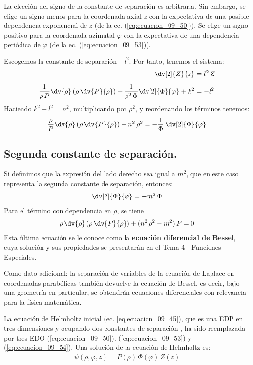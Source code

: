 La elección del signo de la constante de separación es arbitraria. Sin embargo, se elige un signo menos para la coordenada axial $z$ con la expectativa de una posible dependencia exponencial de $z$ (de la ec. (\ref{eq:ecuacion_09_50})). Se elige un signo positivo para la coordenada azimutal $\varphi$ con la expectativa de una dependencia periódica de $\varphi$ (de la ec. (\ref{eq:ecuacion_09_53})).
\par
Escogemos la constante de separación $- l^{2}$. Por tanto, tenemos el sistema:
\begin{align}
\dv[2]{Z}{z} &= l^{2} \, Z \label{eq:ecuacion_09_50} \\[0.5em]
\dfrac{1}{\rho \, P} \dv{\rho} \left( \rho \, \dv{P}{\rho} \right) + \dfrac{1}{\rho^{2} \, \Phi} \dv[2]{\Phi}{\varphi} + k^{2} &= - l^{2} \label{eq:ecuacion_09_51}
\end{align}
Haciendo $k^{2} + l^{2} = n^{2}$, multiplicando por $\rho^{2}$, y reordenando los términos tenemos:
\begin{align}
\dfrac{\rho}{P} \dv{\rho} \left( \rho \, \dv{P}{\rho} \right) + n^{2} \, \rho^{2} = - \dfrac{1}{\Phi} \, \dv[2]{\Phi}{\varphi}
\label{eq:ecuacion_09_52}
\end{align}

\subsection{Segunda constante de separación.}

Si definimos que la expresión del lado derecho sea igual a $m^{2}$, que en este caso representa la segunda constante de separación, entonces:
\begin{align}
\dv[2]{\Phi}{\varphi} = - m^{2} \, \Phi
\label{eq:ecuacion_09_53}
\end{align}
Para el término con dependencia en $\rho$, se tiene
\begin{align}
\rho \, \dv{\rho} \left( \rho \, \dv{P}{\rho} \right) + (n^{2} \, \rho^{2} - m^{2}) \, P = 0
\label{eq:ecuacion_09_54}
\end{align}
Esta última ecuación se le conoce como la \textbf{ecuación diferencial de Bessel}, cuya solución y sus propiedades se presentarán en el Tema 4 - Funciones Especiales. 
\par
Como dato adicional: la separación de variables de la ecuación de Laplace en coordenadas parabólicas también devuelve la ecuación de Bessel, es decir, bajo una geometría en particular, se obtendrán ecuaciones diferenciales con relevancia para la física matemática.
\par
La ecuación de Helmholtz inicial (ec. \ref{eq:ecuacion_09_45}), que es una EDP en tres dimensiones y ocupando dos constantes de separación , ha sido reemplazada por tres EDO (\ref{eq:ecuacion_09_50}), (\ref{eq:ecuacion_09_53}) y (\ref{eq:ecuacion_09_54}). Una solución de la ecuación de Helmholtz es:
\begin{align}
\psi (\rho, \varphi, z) = P(\rho) \, \Phi (\varphi) \, Z(z)
\label{eq:ecuacion_09_55}    
\end{align}

